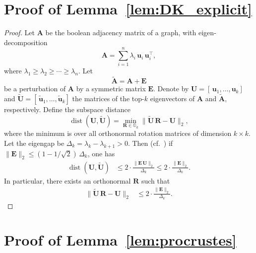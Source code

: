 \documentclass[11pt]{article}
\theoremstyle{plain}
\theoremstyle{definition}
\theoremstyle{remark}
\begin{document}
\section{Proof of Lemma~\ref{lem:DK_explicit}}

\begin{proof}
Let $\mathbf{A}$ be the boolean adjacency matrix of a graph, with eigen‐decomposition
\[
\mathbf{A}
=\sum_{i=1}^n \lambda_i\,\mathbf{u}_i\,\mathbf{u}_i^{\!\top},
\]
where $\lambda_1\ge\lambda_2\ge\cdots\ge\lambda_n$.
Let 
\[
\widetilde{\mathbf A}
=\mathbf A+\mathbf E
\]
be a perturbation of \(\mathbf A\) by a symmetric matrix \(\mathbf E\).  Denote by
\(\mathbf U = [\,\mathbf u_1,\ldots,\mathbf u_k]\) and 
\(\widetilde{\mathbf U} = [\,\widetilde{\mathbf u}_1,\ldots,\widetilde{\mathbf u}_k]\) 
the matrices of the top-\(k\) eigenvectors of \(\mathbf A\) and \(\widetilde{\mathbf A}\), respectively.  Define the subspace distance
\[
\operatorname{dist}(\mathbf U,\widetilde{\mathbf U})
=\min_{\mathbf{R}\in \mathds{O}_{k}}\|\widetilde{\mathbf U}\, \mathbf{R} - \mathbf U\|_2,
\]
where the minimum is over all orthonormal rotation matrices of dimension \(k\times k\).  Let the eigengap be
\(\Delta_{k} = \lambda_{k} - \lambda_{k+1}>0\).  Then (cf.~\citep{chen2021spectral}) if
\(\|\mathbf E\|_2 \le (1-1/\sqrt2)\,\Delta_{k}\), one has
\begin{align}
\operatorname{dist}(\mathbf U,\widetilde{\mathbf U})
&\le
2 \cdot \frac{\|\mathbf E\,\mathbf U\|_2}{\Delta_{k}}
\le
2 \cdot \frac{\|\mathbf E\|_2}{\Delta_{k}}.
\end{align}
In particular, there exists an orthonormal \(\mathbf{R}\) such that
\begin{align}
\|\widetilde{\mathbf U}\, \mathbf{R} - \mathbf U\|_2
&\le
2 \cdot \frac{\|\mathbf E\|_2}{\Delta_{k}}.
\end{align}
\end{proof}




\section{Proof of Lemma~\ref{lem:procrustes}}
\end{document}
